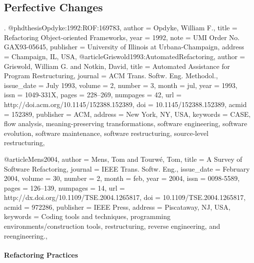\documentclass[runningheads,a4paper]{llncs}
\begin{document}
\subsection{Perfective Changes} 

. 
@phdthesis{Opdyke:1992:ROF:169783,
 author = {Opdyke, William F.},
 title = {Refactoring Object-oriented Frameworks},
 year = {1992},
 note = {UMI Order No. GAX93-05645},
 publisher = {University of Illinois at Urbana-Champaign},
 address = {Champaign, IL, USA},
} 
@article{Griswold1993:AutomatedRefactoring,
 author = {Griswold, William G. and Notkin, David},
 title = {Automated Assistance for Program Restructuring},
 journal = {ACM Trans. Softw. Eng. Methodol.},
 issue_date = {July 1993},
 volume = {2},
 number = {3},
 month = jul,
 year = {1993},
 issn = {1049-331X},
 pages = {228--269},
 numpages = {42},
 url = {http://doi.acm.org/10.1145/152388.152389},
 doi = {10.1145/152388.152389},
 acmid = {152389},
 publisher = {ACM},
 address = {New York, NY, USA},
 keywords = {CASE, flow analysis, meaning-preserving transformations, software engineering, software evolution, software maintenance, software restructuring, source-level restructuring},
} 

@article{Mens2004,
 author = {Mens, Tom and Tourw{\'e}, Tom},
 title = {A Survey of Software Refactoring},
 journal = {IEEE Trans. Softw. Eng.},
 issue_date = {February 2004},
 volume = {30},
 number = {2},
 month = feb,
 year = {2004},
 issn = {0098-5589},
 pages = {126--139},
 numpages = {14},
 url = {http://dx.doi.org/10.1109/TSE.2004.1265817},
 doi = {10.1109/TSE.2004.1265817},
 acmid = {972286},
 publisher = {IEEE Press},
 address = {Piscataway, NJ, USA},
 keywords = {Coding tools and techniques, programming environments/construction tools, restructuring, reverse engineering, and reengineering.},
} 

\paragraph{Refactoring Practices} 
\end{document}

